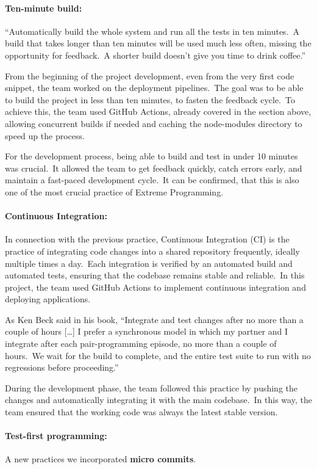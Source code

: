 \paragraph{Ten-minute build:} ``Automatically build the whole system and run all the tests in ten minutes.\ A build that takes longer than ten minutes will be used much less often, missing the opportunity for feedback.\ A shorter build doesn't give you time to drink coffee.''\cite[Extreme Programming]{xp}

From the beginning of the project development, even from the very first code snippet, the team worked on the deployment pipelines.\ The goal was to be able to build the project in less than ten minutes, to fasten the feedback cycle.\ To achieve this, the team used GitHub Actions, already covered in the section above, allowing concurrent builds if needed and caching the node-modules directory to speed up the process.

For the development process, being able to build and test in under 10 minutes was crucial.\ It allowed the team to get feedback quickly, catch errors early, and maintain a fast-paced development cycle.\ It can be confirmed, that this is also one of the most crucial practice of Extreme Programming.

\paragraph{Continuous Integration:} In connection with the previous practice, Continuous Integration (CI) is the practice of integrating code changes into a shared repository frequently, ideally multiple times a day.\ Each integration is verified by an automated build and automated tests, ensuring that the codebase remains stable and reliable.\ In this project, the team used GitHub Actions to implement continuous integration and deploying applications.

As Ken Beck said in his book, ``Integrate and test changes after no more than a couple of hours [\ldots] I prefer a synchronous model in which my partner and I integrate after each pair-programming episode, no more than a couple of hours.\ We wait for the build to complete, and the entire test suite to run with no regressions before proceeding.''\cite[Extreme Programming]{xp}

During the development phase, the team followed this practice by pushing the changes and automatically integrating it with the main codebase.\ In this way, the team ensured that the working code was always the latest stable version.

\paragraph{Test-first programming:}

A new practices we incorporated \textbf{micro commits}.
